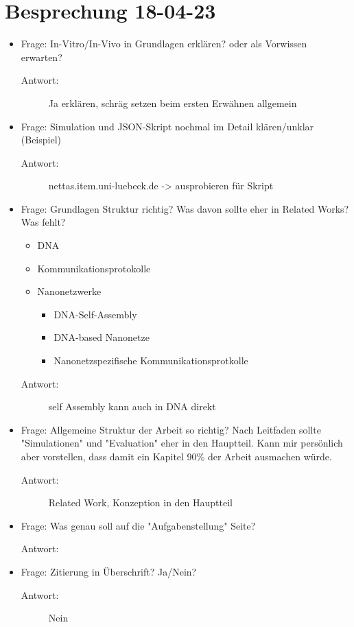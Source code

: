\section{Besprechung 18-04-23}
  \begin{itemize}
    \item Frage: In-Vitro/In-Vivo in Grundlagen erklären? oder als Vorwissen erwarten?
    \begin{description}
      \item[Antwort:] Ja erklären, schräg setzen beim ersten Erwähnen allgemein
    \end{description}
    \item Frage: Simulation und JSON-Skript nochmal im Detail klären/unklar (Beispiel)
    \begin{description}
      \item[Antwort:] nettas.item.uni-luebeck.de -> ausprobieren für Skript
    \end{description}
    \item Frage: Grundlagen Struktur richtig? Was davon sollte eher in Related Works? Was fehlt?
    \begin{itemize}
      \item DNA
      \item Kommunikationsprotokolle
      \item Nanonetzwerke
      \begin{itemize}
        \item DNA-Self-Assembly
        \item DNA-based Nanonetze
        \item Nanonetzspezifische Kommunikationsprotkolle
      \end{itemize}
    \end{itemize}
    \begin{description}
      \item[Antwort:] self Assembly kann auch in DNA direkt
    \end{description}
    \item Frage: Allgemeine Struktur der Arbeit so richtig? Nach Leitfaden sollte "Simulationen" und "Evaluation" eher in den Hauptteil. Kann mir persönlich aber vorstellen, dass damit ein Kapitel 90\% der Arbeit ausmachen würde.
    \begin{description}
      \item[Antwort:] Related Work, Konzeption in den Hauptteil
    \end{description}
    \item Frage: Was genau soll auf die "Aufgabenstellung" Seite?
    \begin{description}
      \item[Antwort:]
    \end{description}
    \item Frage: Zitierung in Überschrift? Ja/Nein?
    \begin{description}
      \item[Antwort:] Nein
    \end{description}
  \end{itemize}

